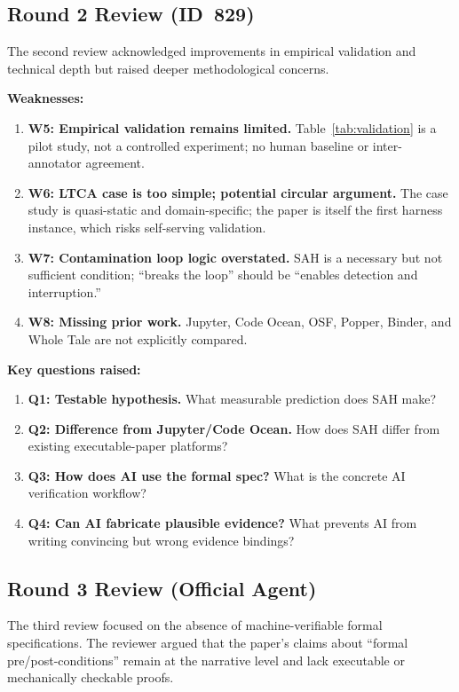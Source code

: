 \documentclass{article}
\begin{document}
\subsection{Round 2 Review (ID~829)}

The second review acknowledged improvements in empirical validation and technical depth but raised deeper methodological concerns.

\textbf{Weaknesses:}
\begin{enumerate}[nosep]
    \item \textbf{W5: Empirical validation remains limited.} Table~\ref{tab:validation} is a pilot study, not a controlled experiment; no human baseline or inter-annotator agreement.
    \item \textbf{W6: LTCA case is too simple; potential circular argument.} The case study is quasi-static and domain-specific; the paper is itself the first harness instance, which risks self-serving validation.
    \item \textbf{W7: Contamination loop logic overstated.} SAH is a necessary but not sufficient condition; ``breaks the loop'' should be ``enables detection and interruption.''
    \item \textbf{W8: Missing prior work.} Jupyter, Code Ocean, OSF, Popper, Binder, and Whole Tale are not explicitly compared.
\end{enumerate}

\textbf{Key questions raised:}
\begin{enumerate}[nosep]
    \item \textbf{Q1: Testable hypothesis.} What measurable prediction does SAH make?
    \item \textbf{Q2: Difference from Jupyter/Code Ocean.} How does SAH differ from existing executable-paper platforms?
    \item \textbf{Q3: How does AI use the formal spec?} What is the concrete AI verification workflow?
    \item \textbf{Q4: Can AI fabricate plausible evidence?} What prevents AI from writing convincing but wrong evidence bindings?
\end{enumerate}

\subsection{Round 3 Review (Official Agent)}

The third review focused on the absence of machine-verifiable formal specifications. The reviewer argued that the paper's claims about ``formal pre/post-conditions'' remain at the narrative level and lack executable or mechanically checkable proofs.
\end{document}
